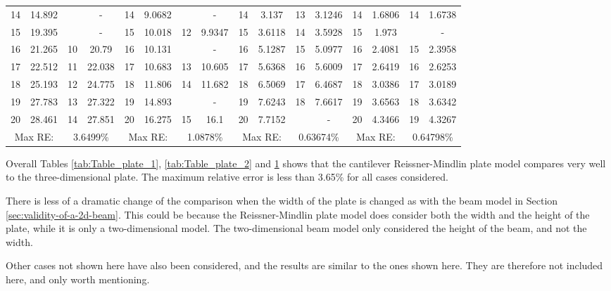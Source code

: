 \documentclass[../../main.tex]{subfiles}
\begin{document}
\begin{table}[htbp]
{{\begin{tabular}{|cccc||cccc||cccc||cccc|}
			14 & 14.892 &  & - & 14 & 9.0682 & & - & 14 & 3.137 & 13 & 3.1246 & 14 & 1.6806 & 14 & 1.6738\\
			15 & 19.395 &  & - & 15 & 10.018 & 12 & 9.9347 & 15 & 3.6118 & 14 & 3.5928 & 15 & 1.973 &  & -\\
			16 & 21.265 & 10 & 20.79 & 16 & 10.131 &  & - & 16 & 5.1287 & 15 & 5.0977 & 16 & 2.4081 & 15 & 2.3958\\
			17 & 22.512 & 11 & 22.038 & 17 & 10.683 & 13 & 10.605 & 17 & 5.6368 & 16 & 5.6009 & 17 & 2.6419 & 16 & 2.6253\\
			18 & 25.193 & 12 & 24.775 & 18 & 11.806 & 14 & 11.682 & 18 & 6.5069 & 17 & 6.4687 & 18 & 3.0386 & 17 & 3.0189\\
			19 & 27.783 & 13 & 27.322 & 19 & 14.893 &  & - & 19 & 7.6243 & 18 & 7.6617 & 19 & 3.6563 & 18 & 3.6342\\
			20 & 28.461 & 14 & 27.851 & 20 & 16.275 & 15 & 16.1 & 20 & 7.7152 &  & - & 20 & 4.3466 & 19 & 4.3267\\
			\hline
			\multicolumn{2}{|c}{Max RE:} & \multicolumn{2}{c||}{3.6499\%} & \multicolumn{2}{c}{Max RE:} & \multicolumn{2}{c||}{1.0878\%} & \multicolumn{2}{c}{Max RE:} & \multicolumn{2}{c||}{0.63674\%} & \multicolumn{2}{c}{Max RE:} & \multicolumn{2}{c|}{0.64798\%} \\
			\hline
		\end{tabular}
		\label{tab:Table_plate_3}
	}}
\end{table}
\FloatBarrier

Overall Tables \ref{tab:Table_plate_1}, \ref{tab:Table_plate_2} and \ref{tab:Table_plate_3} shows that the cantilever Reissner-Mindlin plate model compares very well to the three-dimensional plate. The maximum relative error is less than 3.65\% for all cases considered.

There is less of a dramatic change of the comparison when the width of the plate is changed as with the beam model in Section \ref{sec:validity-of-a-2d-beam}. This could be because the Reissner-Mindlin plate model does consider both the width and the height of the plate, while it is only a two-dimensional model. The two-dimensional beam model only considered the height of the beam, and not the width.

Other cases not shown here have also been considered, and the results are similar to the ones shown here. They are therefore not included here, and only worth mentioning.
\end{document}

